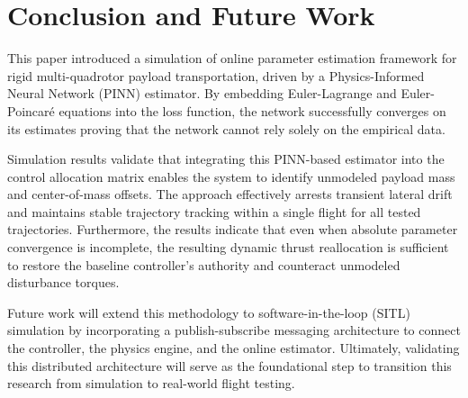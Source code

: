 \section{Conclusion and Future Work}
This paper introduced a simulation of online parameter estimation framework for rigid multi-quadrotor payload transportation, driven by a Physics-Informed Neural Network (PINN) estimator. By embedding Euler-Lagrange and Euler-Poincaré equations into the loss function, the network successfully converges on its estimates proving that the network cannot rely solely on the empirical data.

Simulation results validate that integrating this PINN-based estimator into the control allocation matrix enables the system to identify unmodeled payload mass and center-of-mass offsets. The approach effectively arrests transient lateral drift and maintains stable trajectory tracking within a single flight for all tested trajectories. Furthermore, the results indicate that even when absolute parameter convergence is incomplete, the resulting dynamic thrust reallocation is sufficient to restore the baseline controller's authority and counteract unmodeled disturbance torques.

Future work will extend this methodology to software-in-the-loop (SITL) simulation by incorporating a publish-subscribe messaging architecture to connect the controller, the physics engine, and the online estimator. Ultimately, validating this distributed architecture will serve as the foundational step to transition this research from simulation to real-world flight testing.